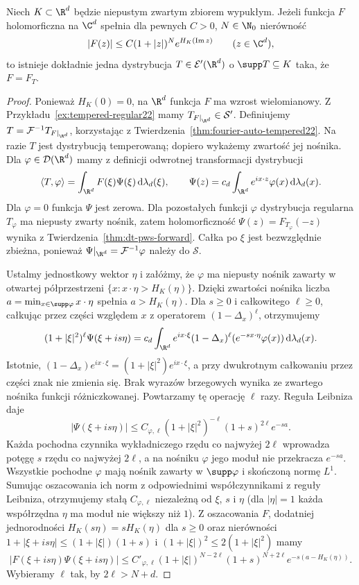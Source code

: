 \begin{twierdzenie}
\label{thm:dt-pws-converse}
Niech $K\subset\R^d$ będzie niepustym zwartym zbiorem
wypukłym. Jeżeli funkcja $F$ holomorficzna na $\C^d$
spełnia dla pewnych $C>0$, $N\in\N_0$ nierówność
\[
 |F(z)|\le C(1+|z|)^N e^{H_K(\operatorname{Im}z)}
 \qquad(z\in\C^d),
\]
to istnieje dokładnie jedna dystrybucja
$T\in\mathcal E'(\R^d)$ o $\supp T\subseteq K$
taka, że $F=F_T$.
\end{twierdzenie}
\begin{proof}
Ponieważ $H_K(0)=0$, na $\R^d$ funkcja $F$ ma
wzrost wielomianowy. Z Przykładu~\ref{ex:tempered-regular22}
mamy $T_{F|_{\R^d}}\in\mathcal S'$.
Definiujemy $T=\mathcal F^{-1}T_{F|_{\R^d}}$,
korzystając z Twierdzenia~\ref{thm:fourier-auto-tempered22}.
Na razie $T$ jest dystrybucją temperowaną; dopiero
wykażemy zwartość jej nośnika.
Dla $\varphi\in\mathcal D(\R^d)$ mamy z definicji
odwrotnej transformacji dystrybucji
\[
 \langle T,\varphi\rangle
 =\int_{\R^d}F(\xi)\Psi(\xi)\,\mathrm d\lambda_d(\xi),
 \qquad
 \Psi(z)=c_d\int_{\R^d}e^{ix\cdot z}\varphi(x)\,
 \mathrm d\lambda_d(x).
\]
Dla $\varphi=0$ funkcja $\Psi$ jest zerowa.
Dla pozostałych funkcji $\varphi$ dystrybucja regularna
$T_\varphi$ ma niepusty zwarty nośnik, zatem
holomorficzność $\Psi(z)=F_{T_\varphi}(-z)$ wynika
z Twierdzenia~\ref{thm:dt-pws-forward}.
Całka po $\xi$ jest bezwzględnie zbieżna,
ponieważ $\Psi|_{\R^d}=\mathcal F^{-1}\varphi$
należy do $\mathcal S$.

Ustalmy jednostkowy wektor $\eta$ i załóżmy, że
$\varphi$ ma niepusty nośnik zawarty w otwartej
półprzestrzeni $\{x:x\cdot\eta>H_K(\eta)\}$.
Dzięki zwartości nośnika liczba
$a=\min_{x\in\supp\varphi}x\cdot\eta$
spełnia $a>H_K(\eta)$.
Dla $s\ge0$ i całkowitego $\ell\ge0$, całkując przez
części względem $x$ z operatorem $(1-\Delta_x)^\ell$,
otrzymujemy
\[
 (1+|\xi|^2)^\ell\Psi(\xi+is\eta)
 =c_d\int_{\R^d}e^{ix\cdot\xi}
 (1-\Delta_x)^\ell(e^{-s x\cdot\eta}\varphi(x))\,
 \mathrm d\lambda_d(x).
\]
Istotnie, $(1-\Delta_x)e^{ix\cdot\xi}
=(1+|\xi|^2)e^{ix\cdot\xi}$, a przy dwukrotnym
całkowaniu przez części znak nie zmienia się.
Brak wyrazów brzegowych wynika ze zwartego nośnika
funkcji różniczkowanej. Powtarzamy tę operację
$\ell$ razy. Reguła Leibniza daje
\[
 |\Psi(\xi+is\eta)|
 \le C_{\varphi,\ell}(1+|\xi|^2)^{-\ell}
                (1+s)^{2\ell}e^{-sa}.
\]
Każda pochodna czynnika wykładniczego rzędu
co najwyżej $2\ell$ wprowadza potęgę $s$ rzędu
co najwyżej $2\ell$, a na nośniku $\varphi$
jego moduł nie przekracza $e^{-sa}$.
Wszystkie pochodne $\varphi$ mają nośnik zawarty
w $\supp\varphi$ i skończoną normę $L^1$. Sumując
oszacowania ich norm z odpowiednimi współczynnikami
z reguły Leibniza, otrzymujemy stałą
$C_{\varphi,\ell}$ niezależną od $\xi$, $s$ i $\eta$
(dla $|\eta|=1$ każda współrzędna $\eta$ ma moduł
nie większy niż $1$).
Z oszacowania $F$, dodatniej jednorodności
$H_K(s\eta)=sH_K(\eta)$ dla $s\ge0$ oraz nierówności
$1+|\xi+is\eta|\le(1+|\xi|)(1+s)$
i $(1+|\xi|)^2\le2(1+|\xi|^2)$ mamy
\[
 |F(\xi+is\eta)\Psi(\xi+is\eta)|
 \le C'_{\varphi,\ell}(1+|\xi|)^{N-2\ell}
 (1+s)^{N+2\ell}e^{-s(a-H_K(\eta))}.
\]
Wybieramy $\ell$ tak, by $2\ell>N+d$.


\end{proof}
